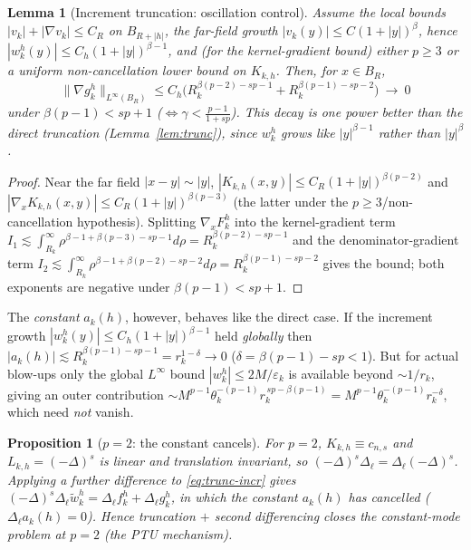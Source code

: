 \documentclass[11pt]{amsart}
\theoremstyle{plain}
\newtheorem{proposition}[theorem]{Proposition}
\newtheorem{lemma}[theorem]{Lemma}
\theoremstyle{definition}
\theoremstyle{remark}
\begin{document}
\begin{lemma}[Increment truncation: oscillation control]\label{lem:trunc-incr}
Assume the local bounds $|v_k|+|\nabla v_k|\le C_R$ on $B_{R+|h|}$, the
far-field growth $|v_k(y)|\le C(1+|y|)^{\beta}$, hence
$|w_k^h(y)|\le C_h(1+|y|)^{\beta-1}$, and \textnormal{(}for the kernel-gradient
bound\textnormal{)} either $p\ge3$ or a uniform non-cancellation lower bound on
$K_{k,h}$. Then, for $x\in B_R$,
\[
  \|\nabla g_k^h\|_{L^\infty(B_R)}\le C_h\big(
   R_k^{\beta(p-2)-sp-1}+R_k^{\beta(p-1)-sp-2}\big)\ \longrightarrow\ 0
\]
under $\beta(p-1)<sp+1$ \textnormal{(}$\Leftrightarrow\gamma<\frac{p-1}{1+sp}$\textnormal{)}.
This decay is \emph{one power better} than the direct truncation
\textnormal{(}Lemma~\ref{lem:trunc}\textnormal{)}, since $w_k^h$ grows like
$|y|^{\beta-1}$ rather than $|y|^{\beta}$.
\end{lemma}
\begin{proof}
Near the far field $|x-y|\sim|y|$, $|K_{k,h}(x,y)|\le C_R(1+|y|)^{\beta(p-2)}$
and $|\nabla_xK_{k,h}(x,y)|\le C_R(1+|y|)^{\beta(p-3)}$ (the latter under the
$p\ge3$/non-cancellation hypothesis). Splitting $\nabla_xF_k^h$ into the
kernel-gradient term $I_1\lesssim\int_{R_k}^\infty\rho^{\beta-1+\beta(p-3)-sp-1}d\rho
=R_k^{\beta(p-2)-sp-1}$ and the denominator-gradient term
$I_2\lesssim\int_{R_k}^\infty\rho^{\beta-1+\beta(p-2)-sp-2}d\rho
=R_k^{\beta(p-1)-sp-2}$ gives the bound; both exponents are negative under
$\beta(p-1)<sp+1$.
\end{proof}

The \emph{constant} $a_k(h)$, however, behaves like the direct case. If the
increment growth $|w_k^h(y)|\le C_h(1+|y|)^{\beta-1}$ held \emph{globally} then
$|a_k(h)|\lesssim R_k^{\beta(p-1)-sp-1}=r_k^{1-\delta}\to0$
($\delta=\beta(p-1)-sp<1$). But for actual blow-ups only the global $L^\infty$
bound $|w_k^h|\le 2M/\varepsilon_k$ is available beyond $\sim1/r_k$, giving an
outer contribution $\sim M^{p-1}\theta_k^{-(p-1)}r_k^{\,sp-\beta(p-1)}
=M^{p-1}\theta_k^{-(p-1)}r_k^{-\delta}$, which need \emph{not} vanish.

\begin{proposition}[$p=2$: the constant cancels]\label{prop:p2cancel}
For $p=2$, $K_{k,h}\equiv c_{n,s}$ and $L_{k,h}=(-\Delta)^s$ is linear and
translation invariant, so $(-\Delta)^s\Delta_\ell=\Delta_\ell(-\Delta)^s$.
Applying a further difference to \eqref{eq:trunc-incr} gives
$(-\Delta)^s\Delta_\ell\tilde w_k^h=\Delta_\ell f_k^h+\Delta_\ell g_k^h$,
in which the constant $a_k(h)$ has cancelled ($\Delta_\ell a_k(h)=0$). Hence
truncation $+$ second differencing closes the constant-mode problem at $p=2$
\textnormal{(}the PTU mechanism\textnormal{)}.
\end{proposition}
\end{document}
